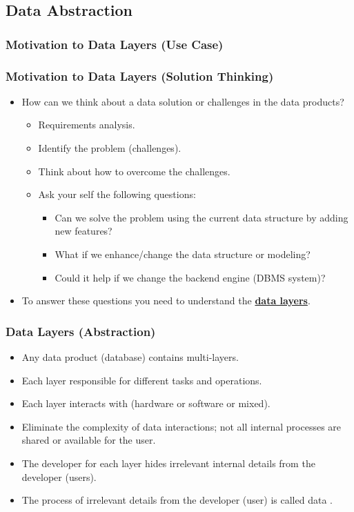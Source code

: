 \subsection{Data Abstraction}
\begin{frame}
	\frametitle{Motivation to Data Layers (Use Case)}	
		

\end{frame}
\begin{frame}
	\frametitle{Motivation to Data Layers (Solution Thinking)}
	
	\begin{itemize}[<+->]
		\item How can we think about a data solution or challenges in the data products?
		\begin{itemize}[<+->]
			\item Requirements analysis.
			\item Identify the problem (challenges).
			\item Think about how to overcome the challenges.
			\item Ask your self the following questions:
			\begin{itemize}[<+->]
				\item Can we solve the problem using the current data structure by adding new features?
				\item What if we enhance/change the data structure or modeling?
				\item Could it help if we change the backend engine \forexample (DBMS system)?
			\end{itemize}			
		\end{itemize}
		\item To answer these questions you need to understand the \textbf{\underline{data layers}}.
	\end{itemize}
	
\end{frame}
\begin{frame}
	\frametitle{Data Layers (Abstraction)}
	\begin{itemize}[<+->]
		\item Any data product (database) contains multi-layers.
		\item Each layer responsible for different tasks and operations.
		\item Each layer interacts with (hardware or software or mixed).
		\item Eliminate the complexity of data interactions; not all internal processes are shared or available for the user.
		\item The developer for each layer hides irrelevant internal details from the developer (users). 
		\item The process of \textbf{\underline{}} irrelevant details from the developer (user) is called data \textbf{\underline{}}.
	\end{itemize}	
\end{frame}
